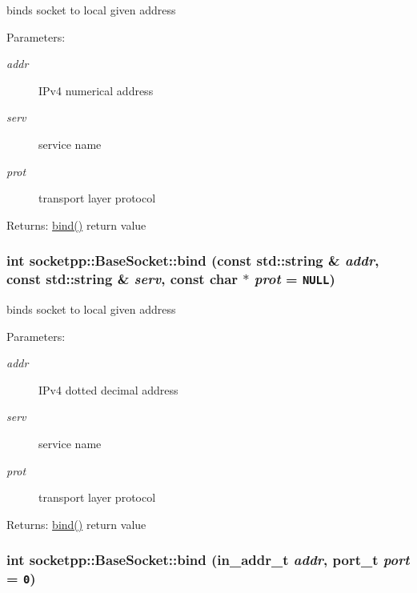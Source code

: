 binds socket to local given address 

\begin{Desc}
\item[Parameters:]
\begin{description}
\item[{\em addr}]IPv4 numerical address \item[{\em serv}]service name \item[{\em prot}]transport layer protocol \end{description}
\end{Desc}
\begin{Desc}
\item[Returns:]\hyperlink{classsocketpp_1_1BaseSocket_78c2a8e6a5c7dfbc708c9cd637e88e51}{bind()} return value \end{Desc}
\hypertarget{classsocketpp_1_1BaseSocket_4775f13f8e1cceaaed40106162b2149f}{
\subsubsection[{bind}]{\setlength{\rightskip}{0pt plus 5cm}int socketpp::BaseSocket::bind (const std::string \& {\em addr}, \/  const std::string \& {\em serv}, \/  const char $\ast$ {\em prot} = {\tt NULL})}}
\label{classsocketpp_1_1BaseSocket_4775f13f8e1cceaaed40106162b2149f}


binds socket to local given address 

\begin{Desc}
\item[Parameters:]
\begin{description}
\item[{\em addr}]IPv4 dotted decimal address \item[{\em serv}]service name \item[{\em prot}]transport layer protocol \end{description}
\end{Desc}
\begin{Desc}
\item[Returns:]\hyperlink{classsocketpp_1_1BaseSocket_78c2a8e6a5c7dfbc708c9cd637e88e51}{bind()} return value \end{Desc}
\hypertarget{classsocketpp_1_1BaseSocket_d3df73f534900d40f9dff26171ec93b5}{
\subsubsection[{bind}]{\setlength{\rightskip}{0pt plus 5cm}int socketpp::BaseSocket::bind (in\_\-addr\_\-t {\em addr}, \/  {\bf port\_\-t} {\em port} = {\tt 0})}}
\label{classsocketpp_1_1BaseSocket_d3df73f534900d40f9dff26171ec93b5}


